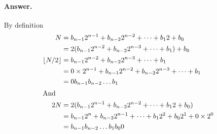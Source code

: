 \paragraph{Answer.} By definition
\begin{align*}
N &= b_{n-1} 2^{n-1} + b_{n-2} 2^{n-2} + \dots + b_1 2 + b_0\\
  &= 2 (b_{n-1} 2^{n-2} + b_{n-2} 2^{n-3} + \dots + b_1) + b_0\\
\lfloor{}N/2\rfloor
  &= b_{n-1} 2^{n-2} + b_{n-2} 2^{n-3} + \dots + b_1\\
  &= 0 \times 2^{n-1} + b_{n-1} 2^{n-2} + b_{n-2} 2^{n-3} + \dots + b_1\\
  &= 0 b_{n-1} b_{n-2} \dots b_1\\
\intertext{And}
2N &= 2(b_{n-1} 2^{n-1} + b_{n-2} 2^{n-2} + \dots + b_1 2 + b_0)\\
   &= b_{n-1} 2^{n} + b_{n-2} 2^{n-1} + \dots + b_1 2^2 + b_0 2^1
      + 0 \times 2^0\\
   &= b_{n-1} b_{n-2} \dots b_1 b_0 0
\end{align*}
